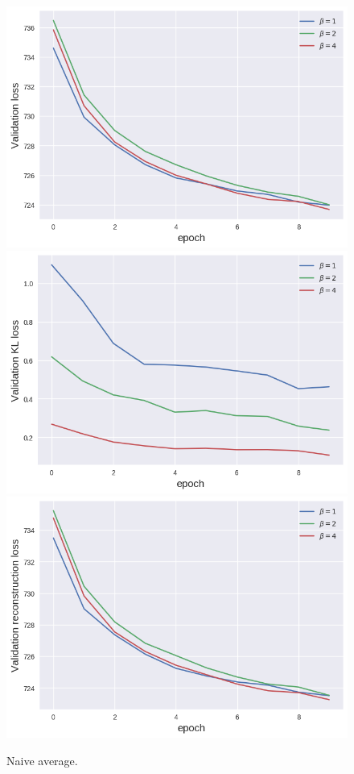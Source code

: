 \begin{figure}[h!]
\centering
\captionsetup{justification=centering}
    \includegraphics[scale=0.5]{figures/results/naive_average/val_loss.png}
    \includegraphics[scale=0.5]{figures/results/naive_average/val_kl_loss.png}
    \includegraphics[scale=0.5]{figures/results/naive_average/val_reconstruction_loss.png}
\caption{Naive average.}
\label{fig:naive_average_graphs}
\end{figure}


